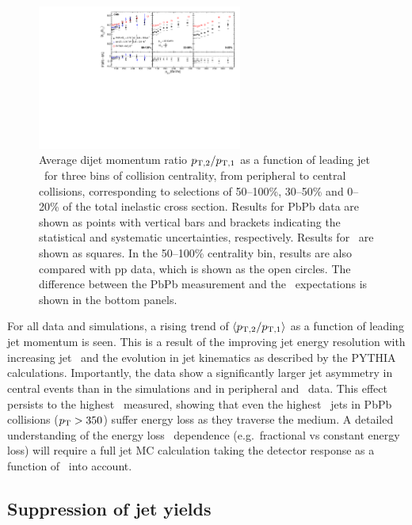 \begin{figure}[!h]
\begin{center}
\includegraphics[width=0.6\textwidth]{jetfigures/deltaPtOverPt5_lead120_sub30_diff_20120103.pdf}
\caption[]{Average dijet momentum ratio $p_{\rm{T},2}/p_{\rm{T},1}$ as a function of
leading jet \pT\ for three bins of collision centrality, from peripheral to central collisions,
corresponding to selections of 50--100\%,  30--50\% and 0--20\%  of the total inelastic cross section.
Results for PbPb data are shown as points with vertical bars and brackets indicating
the statistical and systematic uncertainties, respectively.  Results for \PYTHYD\ are shown as squares. In the 50--100\% centrality bin,
results are also compared with pp data, which is shown as the open circles.
The difference between the PbPb measurement and the \PYTHYD\ expectations is shown in the bottom panels. }
\label{fig:GR:CMS_pt_ratio}
\end{center}
\end{figure}

For all data and simulations, a rising trend of $\langle p_{\rm{T},2}/p_{\rm{T},1} \rangle$ as a function
of leading jet momentum is seen. This is a result of the improving jet energy resolution
with increasing jet \pT\ and the evolution in jet kinematics as described by the PYTHIA 
calculations. Importantly, the data show a significantly larger jet asymmetry in central events
than in the simulations and in peripheral and \pp\ data. This effect persists to the 
highest \pT\ measured, showing that even the highest \pT\ jets in PbPb collisions ($\mbox{$p_{\mathrm{T}}$} > 350$\GeVc)
suffer energy loss as they traverse the medium. A detailed understanding of the energy loss
\pT\ dependence (e.g.\ fractional vs constant energy loss) will require a full jet MC calculation
taking the detector response as a function of \pT\ into account.

\subsection{Suppression of jet yields}

